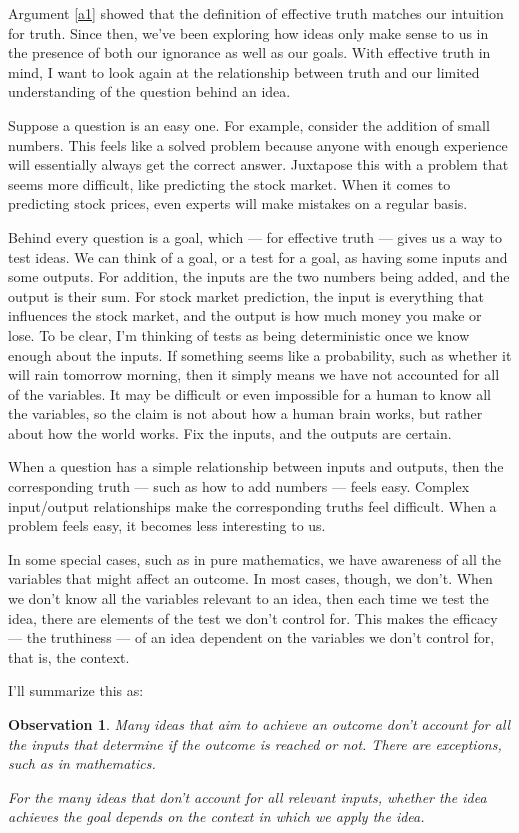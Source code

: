 \documentclass[11pt, oneside]{article}   	%
\newtheorem{obs}{Observation}
\begin{document}
Argument \ref{a1} showed that 
the definition of effective truth matches our
intuition for truth.
Since then,
we've been exploring how ideas only make sense to us in the
presence of both our ignorance as well as our goals.
With effective truth in mind, I want to look again at
the relationship between truth and our limited understanding of the
question behind an idea.

Suppose a question is an easy one. For example, consider the addition of small
numbers. This feels like a solved problem because anyone with enough experience
will essentially always get the correct answer.
Juxtapose this with a problem that seems more difficult, like predicting the
stock market. When it comes to predicting stock prices, even experts will make
mistakes on a regular basis.

Behind every question is a goal, which --- for effective truth --- gives
us a way to test ideas.
We can think of a goal, or a test for a goal, as having some inputs
and some outputs. For addition, the inputs are the two numbers being added, and
the output is their sum. For stock market prediction, the input is everything
that influences the stock market,
and the output is how much
money you make or lose.
To be clear, I'm thinking of tests as being deterministic once we know enough
about the inputs. If something seems like a probability, such as whether it will
rain tomorrow morning, then it simply means we have not accounted for all
of the variables. It may be difficult or even impossible for a human to know all
the variables, so the claim is not about how a human brain works, but rather
about how the world works. Fix the inputs, and the outputs are certain.

When a question has a simple relationship between inputs and outputs, then the
corresponding truth --- such as how to add numbers --- feels easy. Complex
input/output relationships make the corresponding truths feel difficult.
When a problem feels easy, it becomes less interesting to us.

In some special cases, such as in pure mathematics,
we have awareness of all the variables that might affect an outcome.
In most cases, though, we don't.
When we don't know all the variables relevant to an idea, then each time we
test the idea, there are elements of the test we don't control for.
This makes the efficacy --- the truthiness --- of an idea dependent on the
variables we don't control for, that is, the context.

I'll summarize this as:
\begin{obs}\label{o6}
    Many ideas that aim to achieve an outcome don't account for all the inputs
    that determine if the outcome is reached or not. There are exceptions, such
    as in mathematics.

    For the many ideas that don't account for all relevant inputs, whether the
    idea achieves the goal depends on the context in which we apply the idea.
\end{obs}
\end{document}
